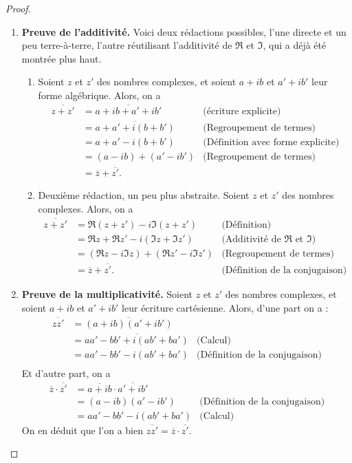 \begin{proof}
\begin{enumerate}
\item \textbf{Preuve de l'additivité.} Voici deux rédactions possibles, l'une directe et un peu \og terre-à-terre\fg, l'autre réutilisant l'additivité de $\Re$ et $\Im$, qui a déjà été montrée plus haut.
\begin{enumerate}
\item Soient $z$ et $z'$ des nombres complexes, et soient $a+ib$ et $a'+ib'$ leur forme algébrique. Alors, on a 
\begin{align*}
\overline{z+z'} &= \overline{a+ib+a'+ib'} & \text{(écriture explicite)}\\
&= \overline{a+a'+i(b+b')} &\text{(Regroupement de termes)}\\
&=a+a'-i(b+b')& \text{(Définition avec forme explicite)}\\
&=(a-ib)+(a'-ib') & \text{(Regroupement de termes)}\\
&= \overline{z}+\overline{z'}.
\end{align*}
\item Deuxième rédaction, un peu plus abstraite. Soient $z$ et $z'$ des nombres complexes. Alors, on a
\begin{align*}
\overline{z+z'} &= \Re(z+z')-i\Im(z+z') &\text{(Définition)}\\
&= \Re z+\Re z' -i\left(\Im z+\Im z'\right) & \text{(Additivité de $\Re$ et $\Im$)}\\
&=\left(\Re z- i\Im z\right) + \left(\Re z'- i\Im z'\right) & \text{(Regroupement de termes)}\\
&= \overline{z} + \overline{z'}. & \text{(Définition de la conjugaison)}
\end{align*}
\end{enumerate}

\item \textbf{Preuve de la multiplicativité.} Soient $z$ et $z'$ des nombres complexes, et soient $a+ib$ et $a'+ib'$ leur écriture cartésienne. Alors, d'une part on a :
\begin{align*}
\overline{zz'} &= \overline{(a+ib)(a'+ib')}\\
&=\overline{aa'-bb'+i(ab'+ba')} & \text{(Calcul)}\\
&=aa'-bb'-i(ab'+ba')& \text{(Définition de la conjugaison)}\\
\end{align*}
Et d'autre part, on a 
\begin{align*}
\overline{z}\cdot \overline{z'} &= \overline{a+ib}\cdot \overline{a'+ib'}\\
&=(a-ib)(a'-ib')& \text{(Définition de la conjugaison)}\\
&=aa'-bb'-i(ab'+ba') & \text{(Calcul)}
\end{align*}
On en déduit que l'on a bien $\overline{zz'} = \overline{z}\cdot\overline{z'}$.
\end{enumerate}
\end{proof}



